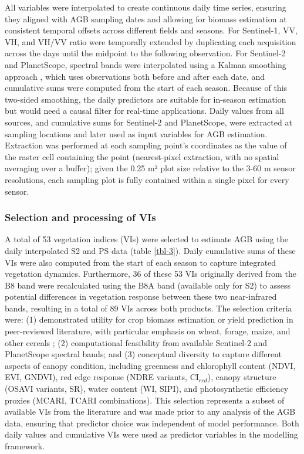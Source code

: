 \documentclass[
  british,
]{interact}
\begin{document}
All variables were interpolated to create continuous daily time series,
ensuring they aligned with AGB sampling dates and allowing for biomass
estimation at consistent temporal offsets across different fields and
seasons. For Sentinel-1, VV, VH, and VH/VV ratio were temporally
extended by duplicating each acquisition across the days until the
midpoint to the following observation. For Sentinel-2 and PlanetScope,
spectral bands were interpolated using a Kalman smoothing approach
\citep{Moritz2017}, which uses observations both before and after each
date, and cumulative sums were computed from the start of each season.
Because of this two-sided smoothing, the daily predictors are suitable
for in-season estimation but would need a causal filter for real-time
applications. Daily values from all sources, and cumulative sums for
Sentinel-2 and PlanetScope, were extracted at sampling locations and
later used as input variables for AGB estimation. Extraction was
performed at each sampling point's coordinates as the value of the
raster cell containing the point (nearest-pixel extraction, with no
spatial averaging over a buffer); given the 0.25 m² plot size relative
to the 3-60 m sensor resolutions, each sampling plot is fully contained
within a single pixel for every sensor.

\subsubsection{Selection and processing of
VIs}\label{selection-and-processing-of-vis}

A total of 53 vegetation indices (VIs) were selected to estimate AGB
using the daily interpolated S2 and PS data (table \ref{tbl-3}). Daily
cumulative sums of these VIs were also computed from the start of each
season to capture integrated vegetation dynamics. Furthermore, 36 of
these 53 VIs originally derived from the B8 band were recalculated using
the B8A band (available only for S2) to assess potential differences in
vegetation response between these two near-infrared bands, resulting in
a total of 89 VIs across both products. The selection criteria were: (1)
demonstrated utility for crop biomass estimation or yield prediction in
peer-reviewed literature, with particular emphasis on wheat, forage,
maize, and other cereals
\citep{Peng2023, Segarra2022, Uribeetxebarria2023, Wang2022, Wu2008, Zheng2017};
(2) computational feasibility from available Sentinel-2 and PlanetScope
spectral bands; and (3) conceptual diversity to capture different
aspects of canopy condition, including greenness and chlorophyll content
(NDVI, EVI, GNDVI), red edge response (NDRE variants, CI\(_{red}\)),
canopy structure (OSAVI variants, SR), water content (WI, SIPI), and
photosynthetic efficiency proxies (MCARI, TCARI combinations). This
selection represents a subset of available VIs from the literature and
was made prior to any analysis of the AGB data, ensuring that predictor
choice was independent of model performance. Both daily values and
cumulative VIs were used as predictor variables in the modelling
framework.
\end{document}
